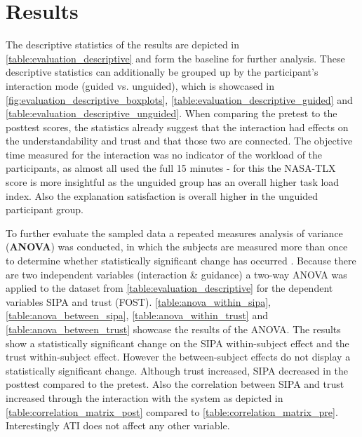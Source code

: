 \documentclass[11pt,a4paper,english]{scrreprt}
\begin{document}
\section{Results}\label{section:evaluation_results}
The descriptive statistics of the results are depicted in \autoref{table:evaluation_descriptive} and form the baseline for further analysis. These descriptive statistics can additionally be grouped up by the participant's interaction mode (guided vs. unguided), which is showcased in \autoref{fig:evaluation_descriptive_boxplots}, \autoref{table:evaluation_descriptive_guided} and \autoref{table:evaluation_descriptive_unguided}. When comparing the pretest to the posttest scores, the statistics already suggest that the interaction had effects on the understandability and trust and that those two are connected. The objective time measured for the interaction was no indicator of the workload of the participants, as almost all used the full 15 minutes - for this the NASA-TLX score is more insightful as the unguided group has an overall higher task load index. Also the explanation satisfaction is overall higher in the unguided participant group.

To further evaluate the sampled data a repeated measures analysis of variance (\textbf{ANOVA}) was conducted, in which the subjects are measured more than once to determine whether statistically significant change has occurred \parencite{vogt_dictionary_2011}. Because there are two independent variables (interaction \& guidance) a two-way ANOVA was applied to the dataset from \autoref{table:evaluation_descriptive} for the dependent variables SIPA and trust (FOST). \autoref{table:anova_within_sipa}, \autoref{table:anova_between_sipa}, \autoref{table:anova_within_trust} and \autoref{table:anova_between_trust} showcase the results of the ANOVA. The results show a statistically significant change on the SIPA within-subject effect and the trust within-subject effect. However the between-subject effects do not display a statistically significant change. Although trust increased, SIPA decreased in the posttest compared to the pretest. Also the correlation between SIPA and trust increased through the interaction with the system as depicted in \autoref{table:correlation_matrix_post} compared to \autoref{table:correlation_matrix_pre}. Interestingly ATI does not affect any other variable.
\end{document}
